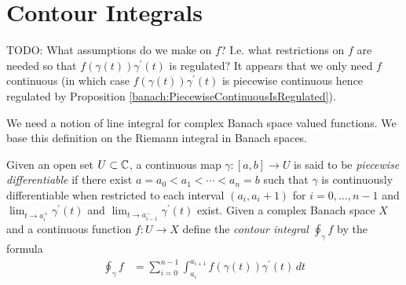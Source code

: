 \section{Contour Integrals}

TODO: What assumptions do we make on $f$?   I.e. what restrictions on $f$ are needed so that $f(\gamma(t)) \gamma^\prime(t) $ is regulated?   It appears that we only need $f$ continuous (in which case $f(\gamma(t)) \gamma^\prime(t) $ is piecewise continuous hence regulated  by Proposition \ref{banach:PiecewiseContinuousIsRegulated}).

We need a notion of line integral for complex Banach space valued functions.   We base this definition on the Riemann integral in Banach spaces.  
\begin{defn}Given an open set $U \subset \mathbb{C}$, a continuous map $\gamma : [a,b] \to U$ is said to be \emph{piecewise differentiable} if there exist $a = a_0 < a_1 < \cdots < a_n = b$ such that $\gamma$ is continuously differentiable when restricted to each interval $(a_i, a_i+1)$ for $i=0, \dots, n-1$ and $\lim_{t \to a_i^+} \gamma^\prime(t)$ and $\lim_{t \to a_{i-1}^-} \gamma^\prime(t)$ exist.  Given a complex Banach space $X$ and a continuous function $f : U \to X$ define the \emph{contour integral} $\oint_\gamma f$ by the formula
\begin{align*}
\oint_\gamma f &= \sum_{i=0}^{n-1} \int_{a_i}^{a_{i+1}} f(\gamma(t)) \gamma^\prime(t) \, dt
\end{align*}
\end{defn}

